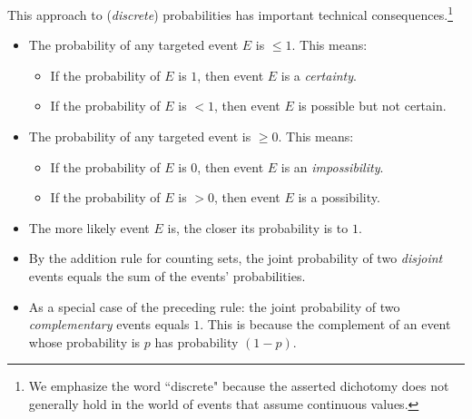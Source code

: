 \noindent
This approach to ({\em discrete}) probabilities has important technical consequences.\footnote{We emphasize the word ``discrete" because the asserted dichotomy does not generally hold in the world of events that assume continuous values.}
  \begin{itemize}
  \item
The probability of any targeted event $E$ is $\leq 1$.  This means:
    \begin{itemize}
    \item
If the probability of $E$ is $1$, then event $E$ is a {\em certainty}.
    \medskip\item
If the probability of $E$ is $< 1$, then event $E$ is possible but not certain.
   \end{itemize}

 \medskip\item
The probability of any targeted event is $\geq 0$.   This means:
    \begin{itemize}
    \item
If the probability of $E$ is $0$, then event $E$ is an {\em impossibility}.
    \medskip\item
If the probability of $E$ is $> 0$, then event $E$ is a possibility.
   \end{itemize}

  \medskip\item
The more likely event $E$ is, the closer its probability is to $1$.
  \medskip\item
By the addition rule for counting sets, the joint probability of two {\em disjoint} events equals the sum of the events' probabilities.
  \medskip\item
As a special case of the preceding rule: the joint probability of two {\em complementary} events
equals $1$.  This is because the complement of an event whose probability is $p$ has
probability  $(1-p)$.
  \end{itemize}

\bigskip

